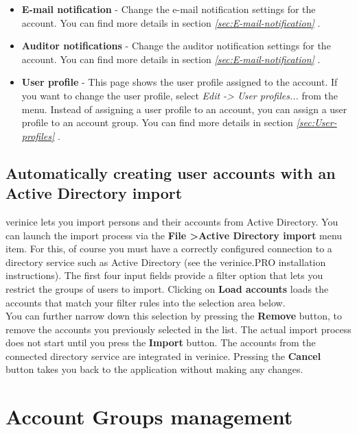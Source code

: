 \documentclass[a4paper,10pt]{book}
\begin{document}
\begin{itemize}
\item \textbf{E-mail notification} - Change the e-mail notification settings for the account. You can find more details in section {\em \ref{sec:E-mail-notification} }.
\item \textbf{Auditor notifications} - Change the auditor notification settings for the account. You can find more details in section {\em \ref{sec:E-mail-notification} }.
\item \textbf{User profile} - This page shows the user profile assigned to the account. If you want to change the user profile, select \textit{Edit -> User profiles...} from the menu. Instead of assigning a user profile to an account, you can assign a user profile to an account group. You can find more details in section {\em \ref{sec:User-profiles} }.
\end{itemize}

\subsection{Automatically creating user accounts with an Active Directory import} \label{Automatically creating user accounts with an Active Directory import}
verinice lets you import persons and their accounts from Active Directory. You can launch the import process via the
\textbf{File \textgreater Active Directory import} menu item. For this, of course you must have a correctly
configured connection to a directory service such as Active Directory (see the verinice.PRO installation instructions).
The first four input fields provide a filter option that lets you restrict the groups of users to import. Clicking on
\textbf{Load accounts} loads the accounts that match your filter rules into the selection area below.
\newline\\
You can further narrow down this selection by pressing the \textbf{Remove} button, to remove the accounts you previously
selected in the list. The actual import process does not start until you press the \textbf{Import} button. The accounts
from the connected directory service are integrated in verinice. Pressing the \textbf{Cancel} button takes you back to the
application without making any changes.

\section{Account Groups management} \label{sec:Account-Groups-management}
\label{sec:account-groups-management}
\end{document}
